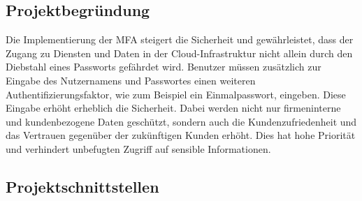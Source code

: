 \subsection{Projektbegründung} 
\label{sec:Projektbegruendung}
Die Implementierung der \acs{MFA} steigert die Sicherheit und gewährleistet, dass der Zugang zu Diensten und Daten in der 
Cloud-Infrastruktur nicht allein durch den Diebstahl eines Passworts gefährdet wird. Benutzer müssen zusätzlich zur Eingabe des 
Nutzernamens und Passwortes einen weiteren Authentifizierungsfaktor, wie zum Beispiel ein Einmalpasswort, eingeben. Diese 
Eingabe erhöht erheblich die Sicherheit. Dabei werden nicht nur firmeninterne und kundenbezogene Daten geschützt, sondern auch 
die Kundenzufriedenheit und das Vertrauen gegenüber der zukünftigen Kunden erhöht. Dies hat hohe Priorität und verhindert 
unbefugten Zugriff auf sensible Informationen.


\subsection{Projektschnittstellen} 
\label{sec:Projektschnittstellen}

